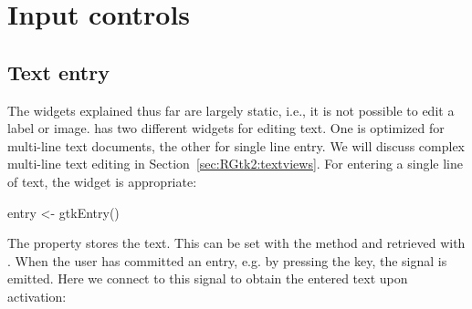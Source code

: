 




\section{Input controls}

\subsection{Text entry}
\label{sec:RGtk2:gtkEntry}

The widgets explained thus far are largely static, i.e., it is not
possible to edit a label or image. \GTK\/ has two different widgets
for editing text. One is optimized for multi-line text documents, the
other for single line entry. We will discuss complex multi-line text
editing in Section~\ref{sec:RGtk2:textviews}. For entering a single
line of text, the  widget is appropriate:
\begin{Schunk}
\begin{Sinput}
 entry <- gtkEntry()
\end{Sinput}
\end{Schunk}

The  property stores the text. This can be set with the
method  and retrieved with
.  When the user has committed an entry,
e.g. by pressing the  key, the  signal is
emitted. Here we connect to this signal to obtain the entered text upon
activation:
\begin{Schunk}
\end{Schunk}

